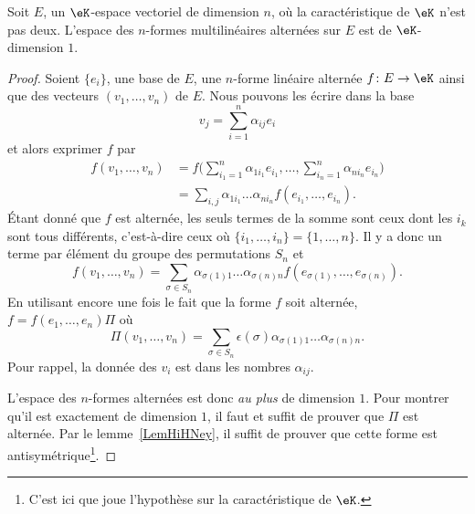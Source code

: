 \begin{proposition} \label{ProprbjihK}
    Soit \( E\), un \( \eK\)-espace vectoriel de dimension \( n\), où la caractéristique de \( \eK\) n'est pas deux. L'espace des \( n\)-formes multilinéaires alternées sur \( E\) est de \( \eK\)-dimension \( 1\).
\end{proposition}

\begin{proof}
    Soient \( \{ e_i \}\), une base de \( E\), une \( n\)-forme linéaire alternée \( f\colon E\to \eK\) ainsi que des vecteurs \( (v_1,\ldots, v_n)\) de \( E\). Nous pouvons les écrire dans la base
    \begin{equation}
        v_j=\sum_{i=1}^n\alpha_{ij}e_i
    \end{equation}
    et alors exprimer \( f\) par
    \begin{subequations}
        \begin{align}
            f(v_1,\ldots, v_n)&=f\big( \sum_{i_1=1}^n\alpha_{1i_1}e_{i_1},\ldots, \sum_{i_n=1}^n\alpha_{ni_n}e_{i_n} \big)\\
            &=\sum_{i,j}\alpha_{1i_1}\ldots \alpha_{ni_n}f(e_{i_1},\ldots, e_{i_n}).
        \end{align}
    \end{subequations}
    Étant donné que \( f\) est alternée, les seuls termes de la somme sont ceux dont les \( i_k\) sont tous différents, c'est-à-dire ceux où \( \{ i_1,\ldots, i_n \}=\{ 1,\ldots, n \}\). Il y a donc un terme par élément du groupe des permutations \( S_n\) et
    \begin{equation}
        f(v_1,\ldots, v_n)=\sum_{\sigma\in S_n}\alpha_{\sigma(1)1}\ldots \alpha_{\sigma(n)n}f(e_{\sigma(1)},\ldots, e_{\sigma(n)}).
    \end{equation}
    En utilisant encore une fois le fait que la forme \( f\) soit alternée, \( f=f(e_1,\ldots, e_n)\Pi\) où
    \begin{equation}
        \Pi(v_1,\ldots, v_n)=\sum_{\sigma\in S_n}\epsilon(\sigma)\alpha_{\sigma(1)1}\ldots \alpha_{\sigma(n)n}.
    \end{equation}
    Pour rappel, la donnée des \( v_i\) est dans les nombres \( \alpha_{ij}\).

    L'espace des \( n\)-formes alternées est donc \emph{au plus} de dimension \( 1\). Pour montrer qu'il est exactement de dimension \( 1\), il faut et suffit de prouver que \( \Pi\) est alternée. Par le lemme~\ref{LemHiHNey}, il suffit de prouver que cette forme est antisymétrique\footnote{C'est ici que joue l'hypothèse sur la caractéristique de \( \eK\).}.


\end{proof}
